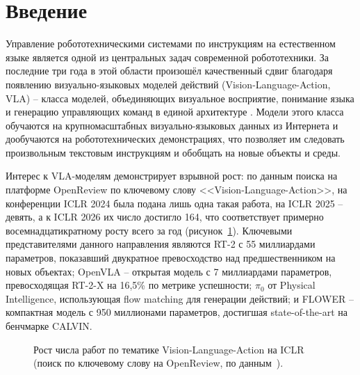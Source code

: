\chapter*{Введение}
\label{ch:intro}

    Управление робототехническими системами по инструкциям на естественном языке является одной из центральных задач современной робототехники. За последние три года в этой области произошёл качественный сдвиг благодаря появлению визуально-языковых моделей действий (Vision-Language-Action, VLA) -- класса моделей, объединяющих визуальное восприятие, понимание языка и генерацию управляющих команд в единой архитектуре \cite{brohan2023rt2, kim2024openvla, black2024pi0}. Модели этого класса обучаются на крупномасштабных визуально-языковых данных из Интернета и дообучаются на робототехнических демонстрациях, что позволяет им следовать произвольным текстовым инструкциям и обобщать на новые объекты и среды.

    Интерес к VLA-моделям демонстрирует взрывной рост: по данным поиска на платформе OpenReview по ключевому слову <<Vision-Language-Action>>, на конференции ICLR 2024 была подана лишь одна такая работа, на ICLR 2025 -- девять, а к ICLR 2026 их число достигло 164, что соответствует примерно восемнадцатикратному росту всего за год \cite{reuss2025blog} (рисунок~\ref{fig:vla_growth}). Ключевыми представителями данного направления являются RT-2 \cite{brohan2023rt2} с 55 миллиардами параметров, показавший двукратное превосходство над предшественником на новых объектах; OpenVLA \cite{kim2024openvla} -- открытая модель с 7 миллиардами параметров, превосходящая RT-2-X на 16,5\% по метрике успешности; $\pi_0$ \cite{black2024pi0} от Physical Intelligence, использующая flow matching для генерации действий; и FLOWER \cite{reuss2025flower} -- компактная модель с 950 миллионами параметров, достигшая state-of-the-art на бенчмарке CALVIN.

\begin{figure}[htbp]
    \centering
    \caption{Рост числа работ по тематике Vision-Language-Action на ICLR (поиск по ключевому слову на OpenReview, по данным~\cite{reuss2025blog}).}
    \label{fig:vla_growth}
\end{figure}

